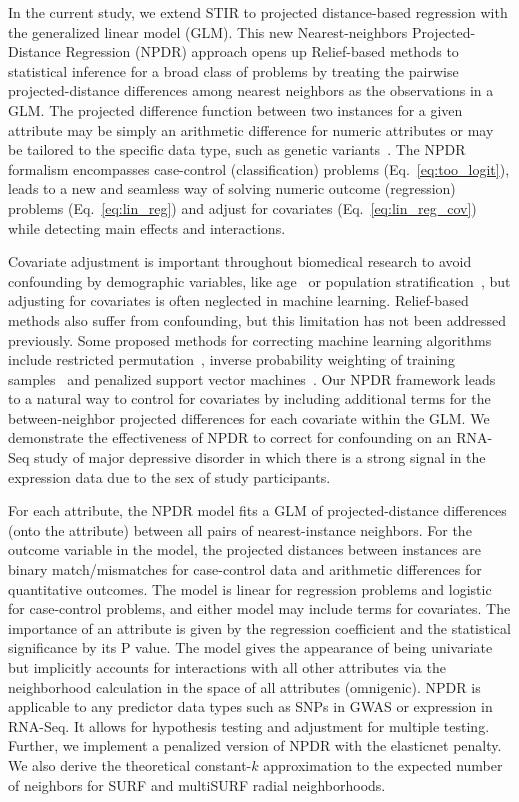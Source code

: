 \documentclass[10pt]{article}
\begin{document}
In the current study, we extend STIR to projected distance-based regression with the generalized linear model (GLM). This new Nearest-neighbors Projected-Distance Regression (NPDR) approach opens up Relief-based methods to statistical inference for a broad class of problems by treating the pairwise projected-distance differences among nearest neighbors as the observations in a GLM. The projected difference function between two instances for a given attribute may be simply an arithmetic difference for numeric attributes or may be tailored to the specific data type, such as genetic variants~\cite{titv}. The NPDR formalism encompasses case-control (classification) problems (Eq.~\ref{eq:too_logit}), leads to a new and seamless way of solving numeric outcome (regression) problems (Eq.~\ref{eq:lin_reg}) and adjust for covariates (Eq.~\ref{eq:lin_reg_cov}) while detecting main effects and interactions. 

Covariate adjustment is important throughout biomedical research to avoid confounding by demographic variables, like age~\cite{le18_brainagesim} or population stratification~\cite{popstrat16}, but adjusting for covariates is often neglected in machine learning. Relief-based methods also suffer from confounding, but this limitation has not been addressed previously. Some proposed methods for correcting machine learning algorithms include restricted permutation~\cite{rao2017}, inverse probability weighting of training samples~\cite{linn2016} and penalized support vector machines~\cite{li2011ccsvm}. Our NPDR framework leads to a natural way to control for covariates by including additional terms for the between-neighbor projected differences for each covariate within the GLM. We demonstrate the effectiveness of NPDR to correct for confounding on an RNA-Seq study of major depressive disorder in which there is a strong signal in the expression data due to the sex of study participants. 

For each attribute, the NPDR model fits a GLM of projected-distance differences (onto the attribute) between all pairs of nearest-instance neighbors. For the outcome variable in the model, the projected distances between instances are binary match/mismatches for case-control data and arithmetic differences for quantitative outcomes. The model is linear for regression problems and logistic for case-control problems, and either model may include terms for covariates. The importance of an attribute is given by the regression coefficient and the statistical significance by its P value. The model gives the appearance of being univariate but implicitly accounts for interactions with all other attributes via the neighborhood calculation in the space of all attributes (omnigenic). NPDR is applicable to any predictor data types such as SNPs in GWAS or expression in RNA-Seq. It allows for hypothesis testing and adjustment for multiple testing. Further, we implement a penalized version of NPDR with the elasticnet penalty. We also derive the theoretical constant-$k$ approximation to the expected number of neighbors for SURF and multiSURF radial neighborhoods. 
\end{document}
